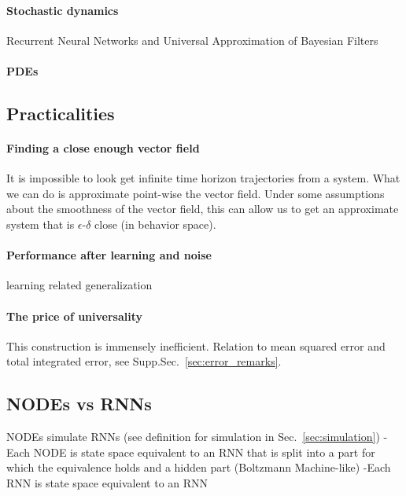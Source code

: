 \documentclass{article}
\theoremstyle{definition} \newtheorem{definition}{Definition}
\theoremstyle{remark} \newtheorem{remark}{Remark}
\newcounter{ct}
\begin{document}
\paragraph{Stochastic dynamics}
\citep{gonon2019reservoir}
\citep{hart2021echo}
\citep{chen2022universal} 
\citep{wei2022statistically}
Recurrent Neural Networks and Universal Approximation of Bayesian Filters \citep{bishop2023recurrent}
\citep{plate2024optimal}
\citep{mishne2024elucidating}
\citep{lipman2024flow}

\paragraph{PDEs}
\citep{richter2022neural}


\subsection{Practicalities}
\paragraph{Finding a close enough vector field}
It is impossible to look get infinite time horizon trajectories from a system.
What we can do is approximate point-wise the vector field.
Under some assumptions about the smoothness of the vector field, this can allow us to get an approximate system that is $\epsilon$-$\delta$ close (in behavior space).

\paragraph{Performance after learning and noise}
learning related generalization \citep{marion2023generalization}\citep{bleistein2023generalization}

\paragraph{The price of universality}
This construction is immensely inefficient.
Relation to mean squared error and total integrated error, see Supp.Sec.~\ref{sec:error_remarks}.


\subsection{NODEs vs RNNs}
NODEs simulate RNNs (see definition for simulation in Sec.~\ref{sec:simulation})
- Each NODE is state space equivalent to an RNN that is split into a part for which the equivalence holds and a hidden part (Boltzmann Machine-like)
-Each RNN is state space equivalent to an RNN
\end{document}
